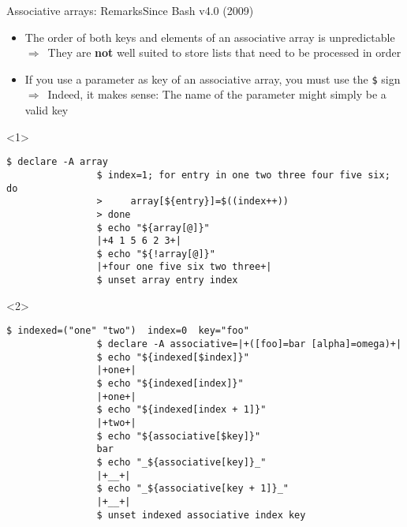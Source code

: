 \begin{frame}[fragile]{Associative arrays: Remarks}{Since Bash v4.0 (2009)}
    \vspace{-5mm}
    \begin{overlayarea}{\textwidth}{0.7\textheight}
        \begin{itemize}
            \item \alert{The order of both keys and elements} of an associative array is \alert{unpredictable}\\
                  $\Rightarrow\,$ They are \textbf{not} well suited to store lists that need to be processed in order
            \item If you use a parameter as key of an associative array, \alert{you must use the \texttt{\$} sign}\\
                  $\Rightarrow\,$ Indeed, it makes sense: The name of the parameter might simply be a valid key
        \end{itemize}
        \begin{onlyenv}<1>
            \begin{lstlisting}[style=MyBash]
                $ declare -A array
                $ index=1; for entry in one two three four five six; do
                >     array[${entry}]=$((index++))
                > done
                $ echo "${array[@]}"
                |+4 1 5 6 2 3+|
                $ echo "${!array[@]}"
                |+four one five six two three+|
                $ unset array entry index
            \end{lstlisting}
        \end{onlyenv}
        \begin{onlyenv}<2>
            \begin{lstlisting}[style=MyBash, firstnumber=10, emph={[7]associative, indexed}]
                $ indexed=("one" "two")  index=0  key="foo"
                $ declare -A associative=|+([foo]=bar [alpha]=omega)+|
                $ echo "${indexed[$index]}"
                |+one+|
                $ echo "${indexed[index]}"
                |+one+|
                $ echo "${indexed[index + 1]}"
                |+two+|
                $ echo "${associative[$key]}"
                bar
                $ echo "_${associative[key]}_"
                |+__+|
                $ echo "_${associative[key + 1]}_"
                |+__+|
                $ unset indexed associative index key
            \end{lstlisting}
        \end{onlyenv}
    \end{overlayarea}
\end{frame}
